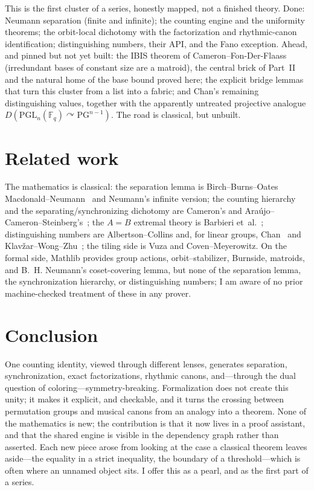 \documentclass[11pt]{article}
\begin{document}
This is the first cluster of a series, honestly mapped, not a finished theory.
Done: Neumann separation (finite and infinite); the counting engine and the
uniformity theorems; the orbit-local dichotomy with the factorization and
rhythmic-canon identification; distinguishing numbers, their API, and the Fano
exception. Ahead, and pinned but not yet built: the IBIS theorem of
Cameron--Fon-Der-Flaass~\cite{CFF1995} (irredundant bases of constant size are a matroid), the
central brick of Part~II and the natural home of the base bound proved here; the
explicit bridge lemmas that turn this cluster from a list into a fabric; and
Chan's remaining distinguishing values, together with the apparently untreated
projective analogue $D(\mathrm{PGL}_n(\mathbb{F}_q)\curvearrowright
\mathrm{PG}^{n-1})$. The road is classical, but unbuilt.

\section{Related work}
\label{sec:related}

The mathematics is classical: the separation lemma is Birch--Burns--Oates
Macdonald--Neumann~\cite{BBMN1976} and Neumann's infinite version; the counting
hierarchy and the separating/synchronizing dichotomy are Cameron's and
Araújo--Cameron--Steinberg's~\cite{ACS2017}; the $A=B$ extremal theory is
Barbieri et~al.~\cite{Barbieri2025}; distinguishing numbers are
Albertson--Collins and, for linear groups, Chan~\cite{Chan2006} and
Klavžar--Wong--Zhu~\cite{KWZ2006}; the tiling side is Vuza and Coven--Meyerowitz.
On the formal side, Mathlib provides group actions, orbit--stabilizer, Burnside,
matroids, and B.~H. Neumann's coset-covering lemma, but none of the separation
lemma, the synchronization hierarchy, or distinguishing numbers; I am aware of no
prior machine-checked treatment of these in any prover.

\section{Conclusion}

One counting identity, viewed through different lenses, generates separation,
synchronization, exact factorizations, rhythmic canons, and---through the dual
question of coloring---symmetry-breaking. Formalization does not create this
unity; it makes it explicit, and checkable, and it turns the crossing between
permutation groups and musical canons from an analogy into a theorem. None of the
mathematics is new; the contribution is that it now lives in a proof assistant,
and that the shared engine is visible in the dependency graph rather than
asserted. Each new piece arose from looking at the case a classical theorem leaves
aside---the equality in a strict inequality, the boundary of a threshold---which is
often where an unnamed object sits. I offer this as a pearl, and as the first part
of a series.
\end{document}
